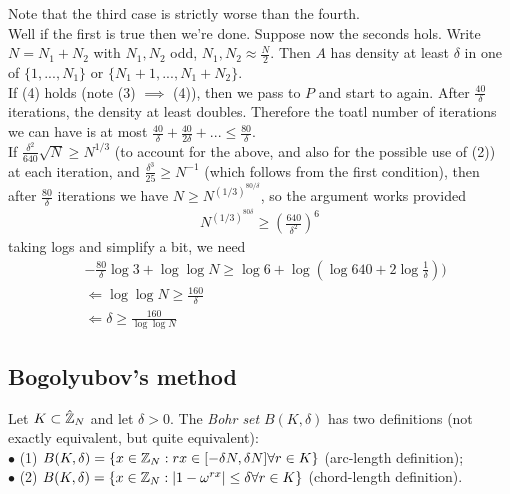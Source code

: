 \documentclass[a4paper]{article}
\begin{document}
Note that the third case is strictly worse than the fourth.\\
Well if the first is true then we're done. Suppose now the seconds hols. Write $N=N_1+N_2$ with $N_1,N_2$ odd, $N_1,N_2 \approx\frac{N}{2}$. Then $A$ has density at least $\delta$ in one of $\{1,...,N_1\}$ or $\{N_1+1,...,N_1+N_2\}$.\\
If (4) holds (note (3) $\implies$ (4)), then we pass to $P$ and start to again. After $\frac{40}{\delta}$ iterations, the density at least doubles. Therefore the toatl number of iterations we can have is at most $\frac{40}{\delta} + \frac{40}{2\delta}+... \leq \frac{80}{\delta}$.\\
If $\frac{\delta^2}{640} \sqrt{N} \geq N^{1/3}$ (to account for the above, and also for the possible use of (2)) at each iteration, and $\frac{\delta^3}{25} \geq N^{-1}$ (which follows from the first condition), then after $\frac{80}{\delta}$ iterations we have $N \geq N^{(1/3)^{80/\delta}}$, so the argument works provided
\begin{equation*}
    \begin{aligned}
        N^{(1/3)^{80\delta}} \geq \left(\frac{640}{\delta^2}\right)^6
    \end{aligned}
\end{equation*}
taking logs and simplify a bit, we need
\begin{equation*}
    \begin{aligned}
        &-\frac{80}{\delta} \log 3 + \log \log N \geq \log 6 + \log (\log 640 + 2 \log \frac{1}{\delta}))\\
        &\Leftarrow \log\log N \geq \frac{160}{\delta}\\
        &\Leftarrow \delta \geq \frac{160}{\log\log N}
    \end{aligned}
\end{equation*}

\subsection{Bogolyubov's method}
Let $K \subset \hat{\mathbb{Z}}_N$ and let $\delta > 0$. The \emph{Bohr set} $B(K,\delta)$ has two definitions (not exactly equivalent, but quite equivalent):\\
$\bullet$ (1) $B(K,\delta) = \{x \in \mathbb{Z}_N: rx \in [-\delta N,\delta N] \forall r \in K\}$ (arc-length definition);\\
$\bullet$ (2) $B(K,\delta) = \{x \in \mathbb{Z}_N: |1-\omega^{rx}| \leq \delta \forall r \in K\}$ (chord-length definition).
\end{document}
